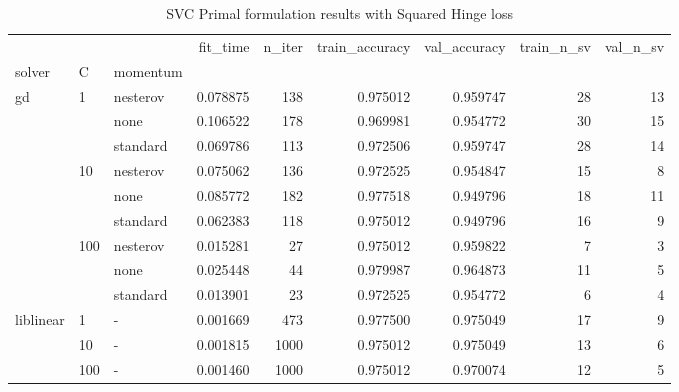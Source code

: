 \begin{table}[h!]
\centering
\caption{SVC Primal formulation results with Squared Hinge loss}
\label{primal_svc_squared_hinge_cv_results}
\begin{tabular}{lllrrrrrr}
\toprule
          &     &   &  fit\_time &  n\_iter &  train\_accuracy &  val\_accuracy &  train\_n\_sv &  val\_n\_sv \\
solver & C & momentum &           &         &                 &               &             &           \\
\midrule
gd & 1   & nesterov &  0.078875 &     138 &        0.975012 &      0.959747 &          28 &        13 \\
          &     & none &  0.106522 &     178 &        0.969981 &      0.954772 &          30 &        15 \\
          &     & standard &  0.069786 &     113 &        0.972506 &      0.959747 &          28 &        14 \\
          & 10  & nesterov &  0.075062 &     136 &        0.972525 &      0.954847 &          15 &         8 \\
          &     & none &  0.085772 &     182 &        0.977518 &      0.949796 &          18 &        11 \\
          &     & standard &  0.062383 &     118 &        0.975012 &      0.949796 &          16 &         9 \\
          & 100 & nesterov &  0.015281 &      27 &        0.975012 &      0.959822 &           7 &         3 \\
          &     & none &  0.025448 &      44 &        0.979987 &      0.964873 &          11 &         5 \\
          &     & standard &  0.013901 &      23 &        0.972525 &      0.954772 &           6 &         4 \\
liblinear & 1   & - &  0.001669 &     473 &        0.977500 &      0.975049 &          17 &         9 \\
          & 10  & - &  0.001815 &    1000 &        0.975012 &      0.975049 &          13 &         6 \\
          & 100 & - &  0.001460 &    1000 &        0.975012 &      0.970074 &          12 &         5 \\
\bottomrule
\end{tabular}
\end{table}
